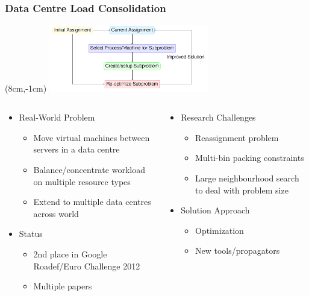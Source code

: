 \begin{frame}
\frametitle{Data Centre Load Consolidation}
\begin{textblock*}{7cm}(8cm,-1cm)
\includegraphics[width=7cm]{images/lnsdesign}
\end{textblock*}
\vspace{1cm}
\begin{columns}[b]
\begin{column}{0.5\textwidth}
\begin{itemize}
\item Real-World Problem
\begin{itemize}
\item Move virtual machines between servers in a data centre
\item Balance/concentrate workload on multiple resource types
\item Extend to multiple data centres across world 
\end{itemize}
\item Status
\begin{itemize}
\item 2nd place in Google Roadef/Euro Challenge 2012
\item Multiple papers
\end{itemize}
\end{itemize}
\end{column}
\begin{column}{0.5\textwidth}
\begin{itemize}
\item Research Challenges
\begin{itemize}
\item Reassignment problem
\item Multi-bin packing constraints
\item Large neighbourhood search to deal with problem size 
\end{itemize}
\item Solution Approach
\begin{itemize}
\item Optimization
\item New tools/propagators
\end{itemize}
\end{itemize}
\end{column}
\end{columns}
\end{frame}

